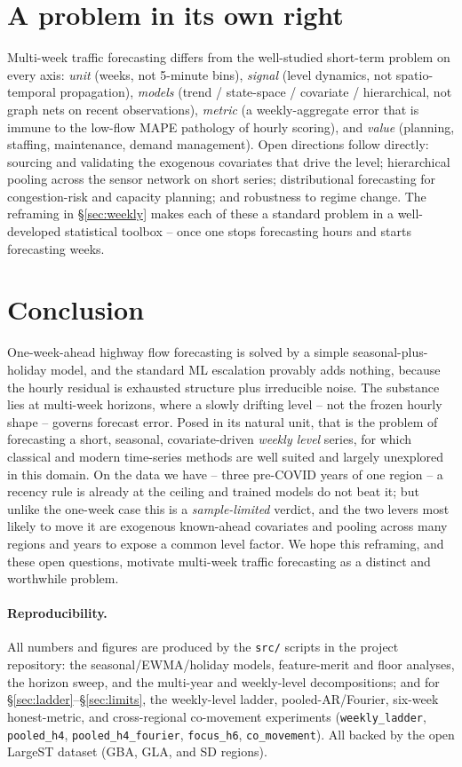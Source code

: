\documentclass[11pt]{article}
\begin{document}
\section{A problem in its own right}
Multi-week traffic forecasting differs from the well-studied short-term problem on
every axis: \emph{unit} (weeks, not 5-minute bins), \emph{signal} (level dynamics,
not spatio-temporal propagation), \emph{models} (trend / state-space / covariate /
hierarchical, not graph nets on recent observations), \emph{metric} (a
weekly-aggregate error that is immune to the low-flow MAPE pathology of hourly
scoring), and \emph{value} (planning, staffing, maintenance, demand management).
Open directions follow directly: sourcing and validating the exogenous covariates
that drive the level; hierarchical pooling across the sensor network on short
series; distributional forecasting for congestion-risk and capacity planning; and
robustness to regime change. The reframing in \S\ref{sec:weekly} makes each of
these a standard problem in a well-developed statistical toolbox -- once one stops
forecasting hours and starts forecasting weeks.

\section{Conclusion}
One-week-ahead highway flow forecasting is solved by a simple seasonal-plus-holiday
model, and the standard ML escalation provably adds nothing, because the hourly
residual is exhausted structure plus irreducible noise. The substance lies at
multi-week horizons, where a slowly drifting level -- not the frozen hourly shape --
governs forecast error. Posed in its natural unit, that is the problem of
forecasting a short, seasonal, covariate-driven \emph{weekly level} series, for
which classical and modern time-series methods are well suited and largely
unexplored in this domain. On the data we have -- three pre-COVID years of one
region -- a recency rule is already at the ceiling and trained models do not beat
it; but unlike the one-week case this is a \emph{sample-limited} verdict, and the
two levers most likely to move it are exogenous known-ahead covariates and pooling
across many regions and years to expose a common level factor. We hope this
reframing, and these open questions, motivate multi-week traffic forecasting as a
distinct and worthwhile problem.

\paragraph{Reproducibility.} All numbers and figures are produced by the
\texttt{src/} scripts in the project repository: the seasonal/EWMA/holiday models,
feature-merit and floor analyses, the horizon sweep, and the multi-year and
weekly-level decompositions; and for \S\ref{sec:ladder}--\S\ref{sec:limits}, the weekly-level ladder,
pooled-AR/Fourier, six-week honest-metric, and cross-regional co-movement
experiments (\texttt{weekly\_ladder}, \texttt{pooled\_h4}, \texttt{pooled\_h4\_fourier},
\texttt{focus\_h6}, \texttt{co\_movement}). All backed by the open LargeST dataset
(GBA, GLA, and SD regions).
\end{document}
